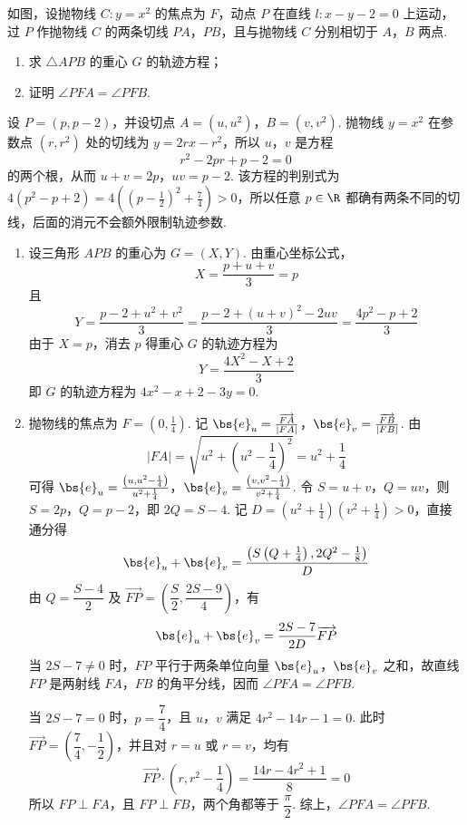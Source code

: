 \begin{problem}
如图，设抛物线 \(C:y=x^{2}\) 的焦点为 \(F\)，动点 \(P\) 在直线 \(l:x-y-2=0\) 上运动，过 \(P\) 作抛物线 \(C\) 的两条切线 \(PA\)，\(PB\)，且与抛物线 \(C\) 分别相切于 \(A\)，\(B\) 两点.

\begin{enumerate}
\item 求 \(\triangle APB\) 的重心 \(G\) 的轨迹方程；
\item 证明 \(\angle PFA=\angle PFB\).
\end{enumerate}

\end{problem}

\begin{solution}
设 \(P=(p,p-2)\)，并设切点 \(A=(u,u^2)\)，\(B=(v,v^2)\). 抛物线 \(y=x^2\) 在参数点 \((r,r^2)\) 处的切线为 \(y=2rx-r^2\)，所以 \(u\)，\(v\) 是方程
\[
r^2-2pr+p-2=0
\]
的两个根，从而
\(u+v=2p\)，\(uv=p-2\).
该方程的判别式为 \(4(p^2-p+2)=4\left((p-\frac12)^2+\frac74\right)>0\)，所以任意 \(p\in\R\) 都确有两条不同的切线，后面的消元不会额外限制轨迹参数.

\begin{enumerate}
\item 设三角形 \(APB\) 的重心为 \(G=(X,Y)\). 由重心坐标公式，
\[
X=\frac{p+u+v}{3}=p
\]
且
\[
Y=\frac{p-2+u^2+v^2}{3}=\frac{p-2+(u+v)^2-2uv}{3}=\frac{4p^2-p+2}{3}
\]
由于 \(X=p\)，消去 \(p\) 得重心 \(G\) 的轨迹方程为
\[
Y=\frac{4X^2-X+2}{3}
\]
即 \(G\) 的轨迹方程为 \(4x^2-x+2-3y=0\).

\item 抛物线的焦点为 \(F=(0,\frac14)\). 记
\(\bs{e}_u=\frac{\overrightarrow{FA}}{|FA|}\)，\(\bs{e}_v=\frac{\overrightarrow{FB}}{|FB|}\).
由
\[
|FA|=\sqrt{u^2+\left(u^2-\frac14\right)^2}=u^2+\frac14
\]
可得
\(\bs{e}_u=\frac{\left(u,u^2-\frac14\right)}{u^2+\frac14}\)，\(\bs{e}_v=\frac{\left(v,v^2-\frac14\right)}{v^2+\frac14}\).
令 \(S=u+v\)，\(Q=uv\)，则 \(S=2p\)，\(Q=p-2\)，即 \(2Q=S-4\). 记 \(D=(u^2+\frac14)(v^2+\frac14)>0\)，直接通分得
\[
\bs{e}_u+\bs{e}_v=\frac{\left(S\left(Q+\frac14\right),2Q^2-\frac18\right)}{D}
\]
由 \(Q=\dfrac{S-4}{2}\) 及 \(\overrightarrow{FP}=\left(\dfrac S2,\dfrac{2S-9}{4}\right)\)，有
\[
\bs{e}_u+\bs{e}_v=\frac{2S-7}{2D}\overrightarrow{FP}
\]
当 \(2S-7\ne0\) 时，\(FP\) 平行于两条单位向量 \(\bs{e}_u\)，\(\bs{e}_v\) 之和，故直线 \(FP\) 是两射线 \(FA\)，\(FB\) 的角平分线，因而 \(\angle PFA=\angle PFB\).

当 \(2S-7=0\) 时，\(p=\dfrac74\)，且 \(u\)，\(v\) 满足 \(4r^2-14r-1=0\). 此时 \(\overrightarrow{FP}=\left(\dfrac74,-\dfrac12\right)\)，并且对 \(r=u\) 或 \(r=v\)，均有
\[
\overrightarrow{FP}\cdot\left(r,r^2-\frac14\right)=\frac{14r-4r^2+1}{8}=0
\]
所以 \(FP\perp FA\)，且 \(FP\perp FB\)，两个角都等于 \(\dfrac\pi2\). 综上，\(\angle PFA=\angle PFB\).
\end{enumerate}
\end{solution}

